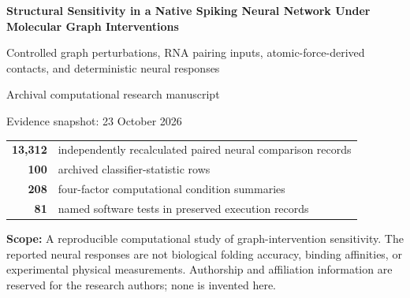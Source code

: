 \documentclass[10pt,a4paper]{article}
\begin{document}
\begin{titlepage}
\vspace*{34mm}
{\Huge\bfseries\color{ink} Structural Sensitivity in a Native Spiking Neural Network Under Molecular Graph Interventions\par}
\vspace{11mm}
{\Large\color{muted} Controlled graph perturbations, RNA pairing inputs, atomic-force-derived contacts, and deterministic neural responses\par}
\vspace{21mm}
{\large Archival computational research manuscript\par}
\vspace{6mm}
{\normalsize Evidence snapshot: 23 October 2026\par}
\vspace{15mm}
\begin{tabular}{rl}
\textbf{13,312} & independently recalculated paired neural comparison records\\
\textbf{100} & archived classifier-statistic rows\\
\textbf{208} & four-factor computational condition summaries\\
\textbf{81} & named software tests in preserved execution records\\
\end{tabular}
\vfill
\textbf{Scope:} A reproducible computational study of graph-intervention sensitivity. The reported neural responses are not biological folding accuracy, binding affinities, or experimental physical measurements. Authorship and affiliation information are reserved for the research authors; none is invented here.
\end{titlepage}
\tableofcontents\clearpage
\end{document}
